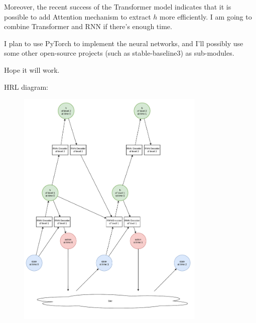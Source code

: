 Moreover, the recent success of the Transformer model \cite{vaswani_attention_2017} indicates that it is possible to add Attention mechanism to extract $h$ more efficiently. I am going to combine Transformer and RNN if there's enough time.

I plan to use PyTorch to implement the neural networks, and I'll possibly use some other open-source projects (such as stable-baseline3) as sub-modules.

Hope it will work.

HRL diagram:
\begin{figure}[h]
    \includegraphics[width=0.8\textwidth]{images/HRL-diagram.pdf}
\end{figure}

\newpage





